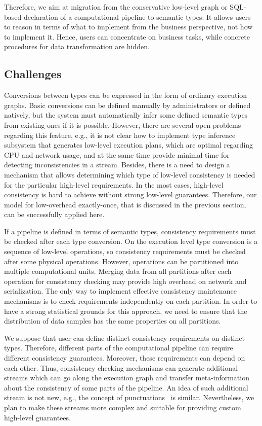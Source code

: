 Therefore, we aim at migration from the conservative low-level graph or SQL-based declaration of a computational pipeline to semantic types. It allows users to reason in terms of what to implement from the business perspective, not how to implement it. Hence, users can concentrate on business tasks, while concrete procedures for data transformation are hidden.

\subsection{Challenges}

Conversions between types can be expressed in the form of ordinary execution graphs. Basic conversions can be defined manually by administrators or defined natively, but the system must automatically infer some defined semantic types from existing ones if it is possible. However, there are several open problems regarding this feature, e.g., it is not clear how to implement type inference subsystem that generates low-level execution plans, which are optimal regarding CPU and network usage, and at the same time provide minimal time for detecting inconsistencies in a stream. Besides, there is a need to design a mechanism that allows determining which type of low-level consistency is needed for the particular high-level requirements. In the most cases, high-level consistency is hard to achieve without strong low-level guarantees. Therefore, our model for low-overhead exactly-once, that is discussed in the previous section, can be successfully applied here.

If a pipeline is defined in terms of semantic types, consistency requirements must be checked after each type conversion. On the execution level type conversion is a sequence of low-level operations, so consistency requirements must be checked after some physical operations. However, operations can be partitioned into multiple computational units. Merging data from all partitions after each operation for consistency checking may provide high overhead on network and serialization. The only way to implement effective consistency maintenance mechanisms is to check requirements independently on each partition. In order to have a strong statistical grounds for this approach, we need to ensure that the distribution of data samples has the same properties on all partitions.

We suppose that user can define distinct consistency requirements on distinct types. Therefore, different parts of the computational pipeline can require different consistency guarantees. Moreover, these requirements can depend on each other. Thus, consistency checking mechanisms can generate additional streams which can go along the execution graph and transfer meta-information about the consistency of some parts of the pipeline. An idea of such additional stream is not new, e.g., the concept of punctuations~\cite{Tucker:2003:EPS:776752.776780} is similar. Nevertheless, we plan to make these streams more complex and suitable for providing custom high-level guarantees.

